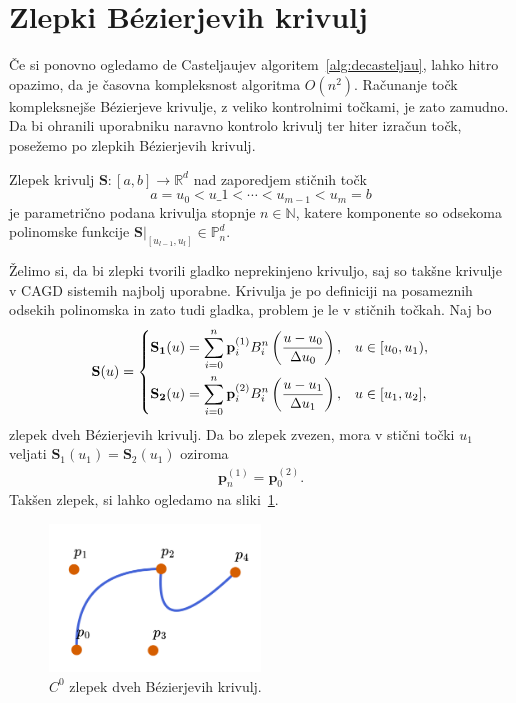 \documentclass[isrm2, tisk]{fmfdelo}
\newcommand{\R}{\mathbb R}
\newcommand{\N}{\mathbb N}
\newcommand{\Pn}{\mathbb P_n}
\newcommand{\p}{\mathbf{p}}
\begin{document}
    \section{Zlepki Bézierjevih krivulj}
    Če si ponovno ogledamo de Casteljaujev algoritem~\ref{alg:decasteljau}, lahko hitro opazimo, da je časovna kompleksnost algoritma $O(n^2)$.
    Računanje točk kompleksnejše Bézierjeve krivulje, z veliko kontrolnimi točkami,  je zato zamudno.
    Da bi ohranili uporabniku naravno kontrolo krivulj ter hiter izračun točk, posežemo po zlepkih Bézierjevih krivulj.
    \begin{definicija}
        Zlepek krivulj $\mathbf{S}:[a,b]\to \R^d$ nad zaporedjem stičnih točk \[a=u_0 < u\_1 < \cdots < u_{m-1} < u_m = b\] je parametrično podana krivulja stopnje $n\in\N$, katere komponente so odsekoma polinomske funkcije $\mathbf{S}|_{[u_{l-1},u_l]} \in \Pn^d$.
    \end{definicija}
    \noindent Želimo si, da bi zlepki tvorili gladko neprekinjeno krivuljo, saj so takšne krivulje v CAGD sistemih najbolj uporabne.
    Krivulja je po definiciji na posameznih odsekih polinomska in zato tudi gladka, problem je le v stičnih točkah.
    Naj bo
    \[\mathbf{S}(u) = \begin{dcases}
                          \mathbf{S_1}(u) = \sum_{i=0}^n \p_i^{(1)}B_i^n\left(\frac{u-u_0}{\Delta u_0}\right), & u \in [u_0,u_1),  \\
                          \mathbf{S_2}(u) = \sum_{i=0}^n \p_i^{(2)}B_i^n\left(\frac{u-u_1}{\Delta u_1}\right), & u \in [u_1,u_2],
    \end{dcases}\]
    zlepek dveh Bézierjevih krivulj.
    Da bo zlepek zvezen, mora v stični točki $u_1$ veljati $\mathbf{S}_1(u_1) = \mathbf{S}_2(u_1)$ oziroma
    \begin{align}
        \label{c0-zlepek-ref}
        \p_n^{(1)} = \p_0^{(2)}.
    \end{align}
    Takšen zlepek, si lahko ogledamo na sliki~\ref{fig:zlepek-c0}.
    \begin{figure}[h]
        \centering
        \includegraphics[width = 0.50\textwidth]{images/zlepek-c0}
        \caption{$C^0$ zlepek dveh Bézierjevih krivulj.}
        \label{fig:zlepek-c0}
    \end{figure}
\end{document}
